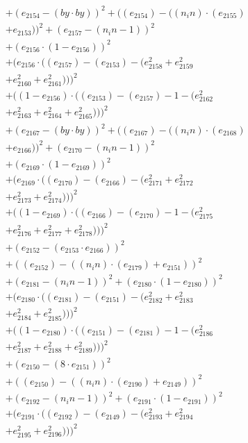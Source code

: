 \documentclass[10pt, a4paper]{article}
\begin{document}
\begin{align*}
& + (e_{2154} - (by  \cdot  by))^{2} + ((e_{2154}) - ((n_in)  \cdot  (e_{2155}) \\
& + e_{2153}))^{2} + (e_{2157} - (n_in - 1))^{2} \\
& + (e_{2156}  \cdot  (1 - e_{2156}))^{2} \\
& + (e_{2156}  \cdot  ((e_{2157}) - (e_{2153}) - (e_{2158}^{2} + e_{2159}^{2} \\
& + e_{2160}^{2} + e_{2161}^{2})))^{2} \\
& + ((1 - e_{2156})  \cdot  ((e_{2153}) - (e_{2157}) - 1 - (e_{2162}^{2} \\
& + e_{2163}^{2} + e_{2164}^{2} + e_{2165}^{2})))^{2} \\
& + (e_{2167} - (by  \cdot  by))^{2} + ((e_{2167}) - ((n_in)  \cdot  (e_{2168}) \\
& + e_{2166}))^{2} + (e_{2170} - (n_in - 1))^{2} \\
& + (e_{2169}  \cdot  (1 - e_{2169}))^{2} \\
& + (e_{2169}  \cdot  ((e_{2170}) - (e_{2166}) - (e_{2171}^{2} + e_{2172}^{2} \\
& + e_{2173}^{2} + e_{2174}^{2})))^{2} \\
& + ((1 - e_{2169})  \cdot  ((e_{2166}) - (e_{2170}) - 1 - (e_{2175}^{2} \\
& + e_{2176}^{2} + e_{2177}^{2} + e_{2178}^{2})))^{2} \\
& + (e_{2152} - (e_{2153}  \cdot  e_{2166}))^{2} \\
& + ((e_{2152}) - ((n_in)  \cdot  (e_{2179}) + e_{2151}))^{2} \\
& + (e_{2181} - (n_in - 1))^{2} + (e_{2180}  \cdot  (1 - e_{2180}))^{2} \\
& + (e_{2180}  \cdot  ((e_{2181}) - (e_{2151}) - (e_{2182}^{2} + e_{2183}^{2} \\
& + e_{2184}^{2} + e_{2185}^{2})))^{2} \\
& + ((1 - e_{2180})  \cdot  ((e_{2151}) - (e_{2181}) - 1 - (e_{2186}^{2} \\
& + e_{2187}^{2} + e_{2188}^{2} + e_{2189}^{2})))^{2} \\
& + (e_{2150} - (8  \cdot  e_{2151}))^{2} \\
& + ((e_{2150}) - ((n_in)  \cdot  (e_{2190}) + e_{2149}))^{2} \\
& + (e_{2192} - (n_in - 1))^{2} + (e_{2191}  \cdot  (1 - e_{2191}))^{2} \\
& + (e_{2191}  \cdot  ((e_{2192}) - (e_{2149}) - (e_{2193}^{2} + e_{2194}^{2} \\
& + e_{2195}^{2} + e_{2196}^{2})))^{2} \\

\end{align*}
\end{document}
